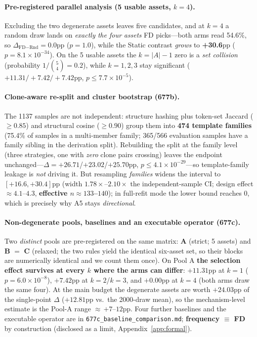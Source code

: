 \paragraph{Pre-registered parallel analysis (5 usable assets, $k{=}4$).}
Excluding the two degenerate assets leaves five candidates, and at $k{=}4$ a random draw lands on
\emph{exactly the four assets} FD picks---both arms read 54.6\%, so
$\Delta_{\text{FD}-\text{Rnd}}{=}\mathbf{0.0}$pp ($p{=}1.0$), while the Static contrast \emph{grows}
to \textbf{+30.6}pp ($p{=}8.1\times10^{-34}$). On the 5 usable assets the $k{=}|A|{-}1$ zero is a
\emph{set collision} (probability $1/\binom54{=}0.2$), while $k{=}1,2,3$ stay significant
($+11.31/+7.42/+7.42$pp, $p\le7.7\times10^{-5}$).

\paragraph{Clone-aware re-split and cluster bootstrap (677b).}
The 1137 samples are not independent: structure hashing plus token-set Jaccard ($\ge0.85$) and
structural cosine ($\ge0.90$) group them into \textbf{474 template families} (75.4\% of samples in a
multi-member family; 365/566 evaluation samples have a family sibling in the derivation split).
Rebuilding the split at the family level (three strategies, one with \emph{zero} clone pairs
crossing) leaves the endpoint unchanged---$\Delta{=}+26.71$/$+23.02$/$+25.70$pp,
$p\le4.1\times10^{-29}$---so template-family leakage is \emph{not} driving it. But resampling
\emph{families} widens the interval to $[+16.6,+30.4]$pp (width $1.78\times$--$2.10\times$ the
independent-sample CI; design effect $\approx4.1$--$4.3$, \textbf{effective $n\approx133$--$140$});
in full-refit mode the lower bound reaches $0$, which is precisely why A5 stays
\emph{directional}.

\paragraph{Non-degenerate pools, baselines and an executable operator (677c).}
Two \emph{distinct} pools are pre-registered on the same matrix: \textbf{A} (strict; 5 assets)
and \textbf{B} $=$ \textbf{C} (relaxed; the two rules yield the identical six-asset set, so their
blocks are numerically identical and we count them once). On Pool A \textbf{the selection effect survives at
every $k$ where the arms can differ}: $+11.31$pp at $k{=}1$ ($p{=}6.0\times10^{-8}$), $+7.42$pp at
$k{=}2$/$k{=}3$, and $+0.00$pp at $k{=}4$ (both arms draw the same four). At the main budget the
degenerate assets are worth $+24.03$pp of the single-point $\Delta$ ($+12.81$pp vs.\ the 2000-draw
mean), so the mechanism-level estimate is the Pool-A range $\approx$\,$+7$--$12$pp. Four further
baselines and the executable operator are in \texttt{677c\_baseline\_comparison.md};
\textbf{frequency $\equiv$ FD} by construction (disclosed as a limit,
Appendix~\ref{app:formal}).

